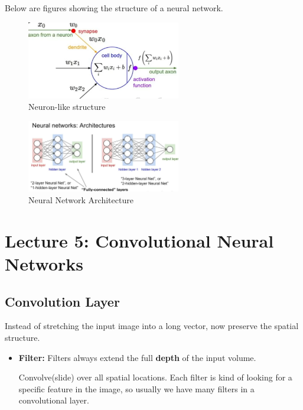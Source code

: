 \documentclass{article}
\numberwithin{equation}{section}
\begin{document}
\begin{CJK}{UTF8}{gbsn}
    Below are figures showing the structure of a neural network.\par
    \begin{figure}[h]
        \centering
        \includegraphics[width=0.6\textwidth]{images/Lecture4/neural_like.png}
        \caption{Neuron-like structure}
        \label{fig:neural_like}
    \end{figure}

    \begin{figure}[h]
        \centering
        \includegraphics[width=0.6\textwidth]{images/Lecture4/neural_network_arch.png}
        \caption{Neural Network Architecture}
        \label{fig:neural_network_arch}
    \end{figure}

\newpage
\section*{Lecture 5: Convolutional Neural Networks}
\setcounter{section}{5}
\setcounter{subsection}{0}
\setcounter{equation}{0}

\subsection{Convolution Layer}
Instead of stretching the input image into a long vector, now preserve the spatial structure.\par
\begin{itemize}
    \item \textbf{Filter:} Filters always extend the full \textbf{depth} of the input volume.\par
    Convolve(slide) over all spatial locations.
    Each filter is kind of looking for a specific feature in the image, so usually we have many filters in a convolutional layer.\par


\end{itemize}
\end{CJK}
\end{document}

